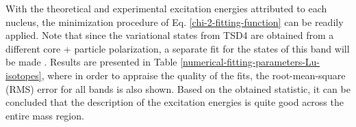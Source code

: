 With the theoretical and experimental excitation energies attributed to each nucleus, the minimization procedure of Eq. \ref{chi-2-fitting-function} can be readily applied. Note that since the variational states from TSD4 are obtained from a different core + particle polarization, a separate fit for the states of this band will be made \cite{raduta2020towards}. Results are presented in Table \ref{numerical-fitting-parameters-Lu-isotopes}, where in order to appraise the quality of the fits, the root-mean-square (RMS) error \cite{kenney1939mathematics} for all bands is also shown. Based on the obtained statistic, it can be concluded that the description of the excitation energies is quite good across the entire mass region.
\begin{table}
    \centering
    \caption{The fitting parameters $\mathcal{P}_\text{fit}$, i.e., the moments of inertia, the single-particle potential strength, and the triaxiality $\gamma$ for each Lu isotope. Numerical results were achieved via the fitting procedure described in text. The number of wobbling states and the root-mean-square error are also given in the last two columns.}
    \label{numerical-fitting-parameters-Lu-isotopes}
\end{table}

